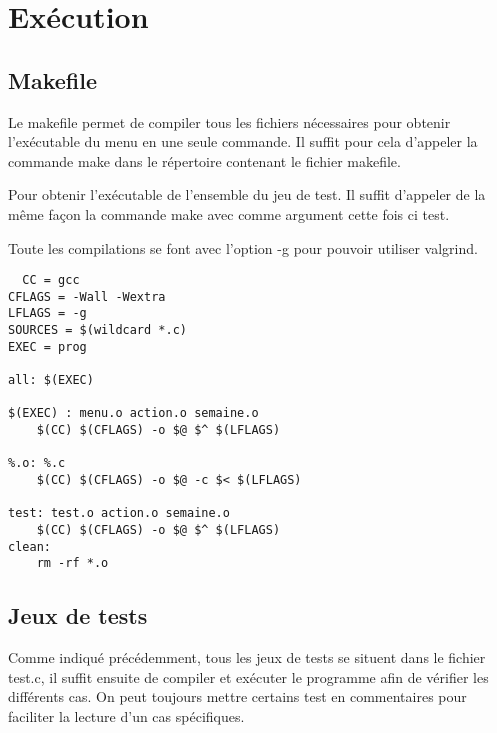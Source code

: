 \documentclass[11pt]{article}
\begin{document}
\section{Exécution}
\label{sec:orgd786a0b}

\subsection{Makefile}
\label{sec:orgb86faef}

Le makefile permet de compiler tous les fichiers nécessaires pour obtenir l'exécutable du
menu en une seule commande. Il suffit pour cela d'appeler la commande make
dans le répertoire contenant le fichier makefile.

Pour obtenir l'exécutable
de l'ensemble du jeu de test. Il suffit d'appeler de la même façon la
commande make avec comme argument cette fois ci test.

Toute les compilations se font avec l'option -g pour pouvoir utiliser valgrind.

\begin{verbatim}
  CC = gcc
CFLAGS = -Wall -Wextra
LFLAGS = -g
SOURCES = $(wildcard *.c)
EXEC = prog

all: $(EXEC)

$(EXEC) : menu.o action.o semaine.o
	$(CC) $(CFLAGS) -o $@ $^ $(LFLAGS)

%.o: %.c
	$(CC) $(CFLAGS) -o $@ -c $< $(LFLAGS)

test: test.o action.o semaine.o
	$(CC) $(CFLAGS) -o $@ $^ $(LFLAGS)	
clean: 
	rm -rf *.o

\end{verbatim}


\subsection{Jeux de tests}
\label{sec:orge8e2690}

Comme indiqué précédemment, tous les jeux de tests se situent dans le fichier
test.c, il suffit ensuite de compiler et exécuter le programme afin de
vérifier les différents cas. On peut toujours mettre certains test en
commentaires pour faciliter la lecture d'un cas spécifiques.
\end{document}
